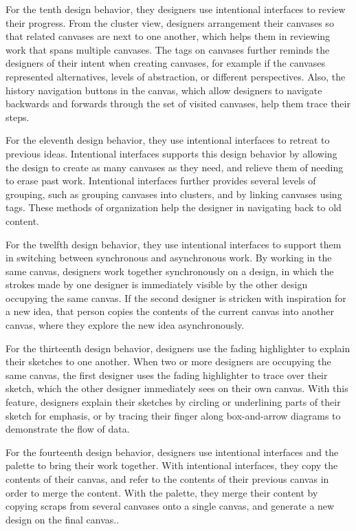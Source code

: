 For the tenth design behavior, they designers use intentional interfaces to review their progress. From the cluster view, designers arrangement their canvases so that related canvases are next to one another, which helps them in reviewing work that spans multiple canvases. The tags on canvases further reminds the designers of their intent when creating canvases, for example if the canvases represented alternatives, levels of abstraction, or different perspectives. Also, the history navigation buttons in the canvas, which allow designers to navigate backwards and forwards through the set of visited canvases, help them trace their steps.

For the eleventh design behavior, they use intentional interfaces to retreat to previous ideas. Intentional interfaces supports this design behavior by allowing the design to create as many canvases as they need, and relieve them of needing to erase past work. Intentional interfaces further provides several levels of grouping, such as grouping canvases into clusters, and by linking canvases using tags. These methods of organization help the designer in navigating back to old content.

For the twelfth design behavior, they use intentional interfaces to support them in switching between synchronous and asynchronous work. By working in the same canvas, designers work together synchronously on a design, in which the strokes made by one designer is immediately visible by the other design occupying the same canvas. If the second designer is stricken with inspiration for a new idea, that person copies the contents of the current canvas into another canvas, where they explore the new idea asynchronously.

For the thirteenth design behavior, designers use the fading highlighter to explain their sketches to one another. When two or more designers are occupying the same canvas, the first designer uses the fading highlighter to trace over their sketch, which the other designer immediately sees on their own canvas. With this feature, designers explain their sketches by circling or underlining parts of their sketch for emphasis, or by tracing their finger along box-and-arrow diagrams to demonstrate the flow of data.

For the fourteenth design behavior, designers use intentional interfaces and the palette to bring their work together. With intentional interfaces, they copy the contents of their canvas, and refer to the contents of their previous canvas in order to merge the content. With the palette, they merge their content by copying scraps from several canvases onto a single canvas, and generate a new design on the final canvas..

